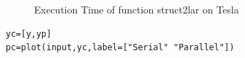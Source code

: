 \documentclass[a4paper,12pt]{article}
\begin{document}
\begin{figure}[!h]
\centering
{}
\caption{Execution Time of function struct2lar on Tesla}
\end{figure}


\noindent{}
\begin{Verbatim}[fontsize=\footnotesize]
yc=[y,yp]
pc=plot(input,yc,label=["Serial" "Parallel"])
\end{Verbatim}
\end{document}
